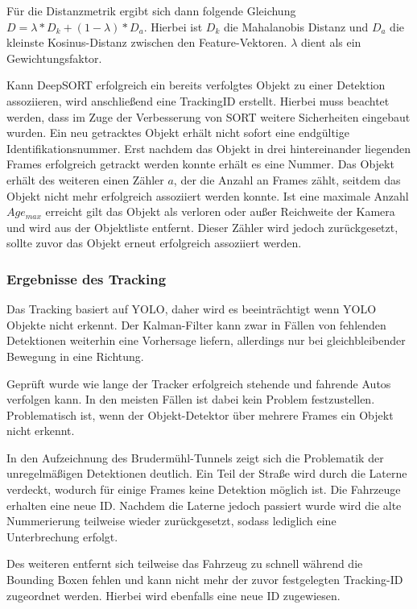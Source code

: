 \documentclass[conference]{IEEEtran}
\begin{document}
	Für die Distanzmetrik ergibt sich dann folgende Gleichung
	$D = \lambda * D_k + (1-\lambda) * D_a$. Hierbei ist $D_k$ die Mahalanobis Distanz und $D_a$ die kleinste Kosinus-Distanz zwischen den Feature-Vektoren. $\lambda$ dient als ein Gewichtungsfaktor.
	
	Kann DeepSORT erfolgreich ein bereits verfolgtes Objekt zu einer Detektion assoziieren, wird anschließend eine TrackingID erstellt. Hierbei muss beachtet werden, dass im Zuge der Verbesserung von SORT weitere Sicherheiten eingebaut wurden. Ein neu getracktes Objekt erhält nicht sofort eine endgültige Identifikationsnummer. Erst nachdem das Objekt in drei hintereinander liegenden Frames erfolgreich getrackt werden konnte erhält es eine Nummer. Das Objekt erhält des weiteren einen Zähler $a$, der die Anzahl an Frames zählt, seitdem das Objekt nicht mehr erfolgreich assoziiert werden konnte. Ist eine maximale Anzahl $Age_{max}$ erreicht gilt das Objekt als verloren oder außer Reichweite der Kamera und wird aus der Objektliste entfernt. Dieser Zähler wird jedoch zurückgesetzt, sollte zuvor das Objekt erneut erfolgreich assoziiert werden.
	
	\subsubsection{Ergebnisse des Tracking}
	Das Tracking basiert auf YOLO, daher wird es beeinträchtigt wenn YOLO Objekte nicht erkennt. Der Kalman-Filter kann zwar in Fällen von fehlenden Detektionen weiterhin eine Vorhersage liefern, allerdings nur bei gleichbleibender Bewegung in eine Richtung. 
	
	Geprüft wurde wie lange der Tracker erfolgreich stehende und fahrende Autos verfolgen kann. In den meisten Fällen ist dabei kein Problem festzustellen. Problematisch ist, wenn der Objekt-Detektor über mehrere Frames ein Objekt nicht erkennt.
	
	In den Aufzeichnung des Brudermühl-Tunnels zeigt sich die Problematik der
	unregelmäßigen Detektionen deutlich. Ein Teil der Straße wird durch die Laterne
	verdeckt, wodurch für einige Frames keine Detektion möglich ist. Die Fahrzeuge
	erhalten eine neue ID. Nachdem die Laterne jedoch passiert wurde wird die alte
	Nummerierung teilweise wieder zurückgesetzt, sodass lediglich eine Unterbrechung
	erfolgt.
	
	Des weiteren entfernt sich teilweise das Fahrzeug zu schnell während die Bounding Boxen fehlen und kann nicht
	mehr der zuvor festgelegten Tracking-ID zugeordnet werden. Hierbei wird ebenfalls eine neue ID zugewiesen.
	
\end{document}
